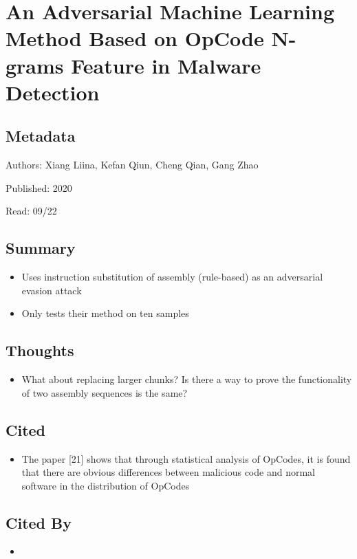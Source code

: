 \documentclass{article}
\begin{document}

\section*{An Adversarial Machine Learning Method Based on OpCode N-grams Feature in Malware Detection}

\subsection*{Metadata}

\noindent Authors: Xiang Liina, Kefan Qiun, Cheng Qian, Gang Zhao

\noindent Published: 2020

\noindent Read: 09/22

\subsection*{Summary}
\begin{itemize}
	\item Uses instruction substitution of assembly (rule-based) as an adversarial evasion attack
	\item Only tests their method on ten samples
\end{itemize}

\subsection*{Thoughts}
\begin{itemize}
	\item What about replacing larger chunks? Is there a way to prove the functionality of two assembly sequences is the same?
\end{itemize}

\subsection*{Cited}
\begin{itemize}
	\item  The paper [21] shows that through
	statistical analysis of OpCodes, it is found that there are
	obvious differences between malicious code and normal
	software in the distribution of OpCodes
\end{itemize}

\subsection*{Cited By}
\begin{itemize}
	\item
\end{itemize}
\end{document}
